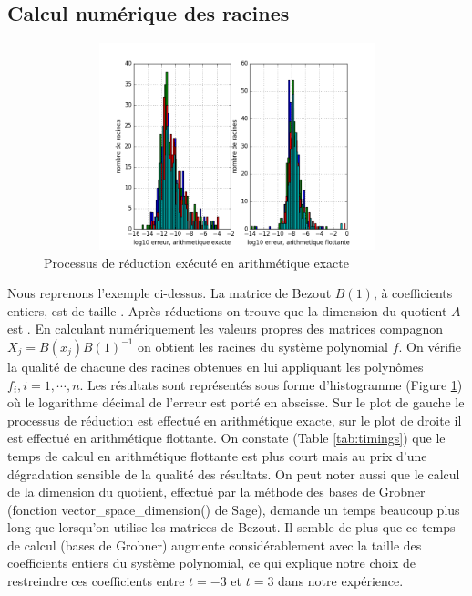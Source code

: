 \documentclass{standalone}
\begin{document}
  \subsection{Calcul numérique des racines}

\begin{figure}[h]
    \caption{Processus de réduction exécuté en arithmétique exacte}
  \label{fig:roots}
  \includegraphics[width=15cm, height=6cm]{../png/roots.png}
\end{figure}
 Nous reprenons l'exemple ci-dessus. La matrice de Bezout $B(1)$, à coefficients entiers, est de taille . Après réductions on trouve que la dimension du quotient $A$ est . En calculant numériquement les valeurs propres des matrices compagnon $X_j = B(x_j)B(1)^{-1}$ on obtient les racines du système polynomial $f$. On vérifie la qualité de chacune des racines obtenues en lui appliquant les polynômes $f_i, i=1,\cdots,n$. Les résultats sont représentés sous forme d'histogramme (Figure \ref{fig:roots}) o\`u le logarithme décimal de l'erreur est porté en abscisse. Sur le plot de gauche le processus de réduction est effectué en arithmétique exacte, sur le plot de droite il est effectué en arithmétique flottante. On constate (Table \ref{tab:timings}) que le temps de calcul en arithmétique flottante est plus court mais au prix d'une dégradation sensible de la qualité des résultats. On peut noter aussi que le calcul de la dimension du quotient, effectué par la méthode des bases de Grobner (fonction vector\_space\_dimension() de Sage), demande un temps beaucoup
plus long que lorsqu'on utilise les matrices de Bezout. Il semble de plus que ce temps de calcul (bases de Grobner) augmente considérablement avec la taille des coefficients entiers du système polynomial, ce qui explique notre choix de restreindre ces coefficients entre $t=-3$ et $t=3$ dans notre expérience.
\end{document}
